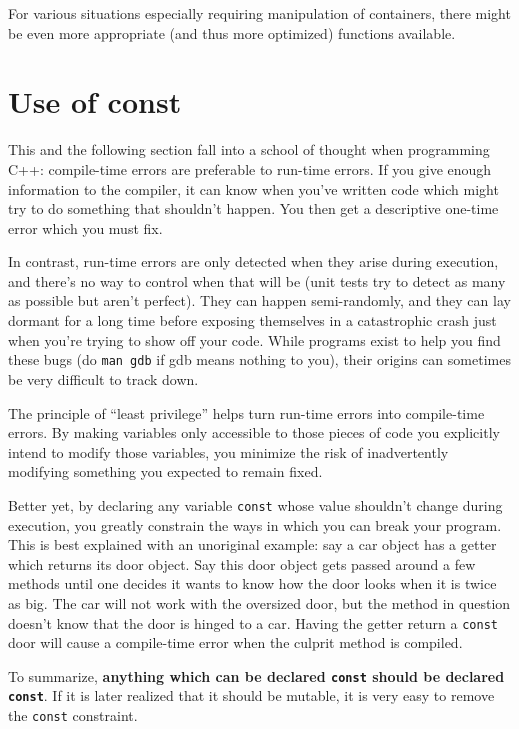\documentclass[10pt,a4paper]{book}
\begin{document}
For various situations especially requiring manipulation of containers, there might be even more appropriate (and thus more optimized) functions available.

\section{Use of const}

This and the following section fall into a school of thought when programming C++: compile-time errors are preferable to run-time errors. If you give enough information to the compiler, it can know when you've written code which might try to do something that shouldn't happen. You then get a descriptive one-time error which you must fix.

In contrast, run-time errors are only detected when they arise during execution, and there's no way to control when that will be (unit tests try to detect as many as possible but aren't perfect). They can happen semi-randomly, and they can lay dormant for a long time before exposing themselves in a catastrophic crash just when you're trying to show off your code. While programs exist to help you find these bugs (do \Verb`man gdb` if gdb means nothing to you), their origins can sometimes be very difficult to track down.

The principle of ``least privilege'' helps turn run-time errors into compile-time errors. By making variables only accessible to those pieces of code you explicitly intend to modify those variables, you minimize the risk of inadvertently modifying something you expected to remain fixed.

Better yet, by declaring any variable \Verb`const` whose value shouldn't change during execution, you greatly constrain the ways in which you can break your program. This is best explained with an unoriginal example: say a car object has a getter which returns its door object. Say this door object gets passed around a few methods until one decides it wants to know how the door looks when it is twice as big. The car will not work with the oversized door, but the method in question doesn't know that the door is hinged to a car. Having the getter return a \Verb`const` door will cause a compile-time error when the culprit method is compiled.

To summarize, \textbf{anything which can be declared \Verb`const` should be declared \Verb`const`}. If it is later realized that it should be mutable, it is very easy to remove the \Verb`const` constraint.
\end{document}
